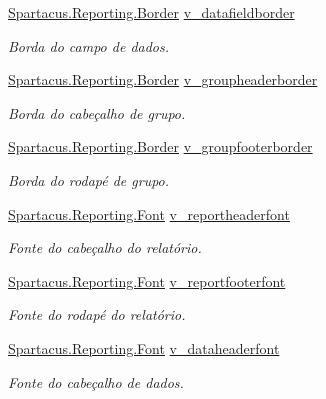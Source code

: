 \begin{DoxyCompactItemize}
\hyperlink{classSpartacus_1_1Reporting_1_1Border}{Spartacus.\+Reporting.\+Border} \hyperlink{classSpartacus_1_1Reporting_1_1Settings_a86f45f3b84d7442c633b4c2ff122ae23}{v\+\_\+datafieldborder}
\begin{DoxyCompactList}\small\item\em Borda do campo de dados. \end{DoxyCompactList}\item 
\hyperlink{classSpartacus_1_1Reporting_1_1Border}{Spartacus.\+Reporting.\+Border} \hyperlink{classSpartacus_1_1Reporting_1_1Settings_a89a455cc29d0713654c88c01e28c8697}{v\+\_\+groupheaderborder}
\begin{DoxyCompactList}\small\item\em Borda do cabeçalho de grupo. \end{DoxyCompactList}\item 
\hyperlink{classSpartacus_1_1Reporting_1_1Border}{Spartacus.\+Reporting.\+Border} \hyperlink{classSpartacus_1_1Reporting_1_1Settings_aa2187138e5652cf09e1c48185c308658}{v\+\_\+groupfooterborder}
\begin{DoxyCompactList}\small\item\em Borda do rodapé de grupo. \end{DoxyCompactList}\item 
\hyperlink{classSpartacus_1_1Reporting_1_1Font}{Spartacus.\+Reporting.\+Font} \hyperlink{classSpartacus_1_1Reporting_1_1Settings_a73b6afdacc9e772b787292f79a7acfa8}{v\+\_\+reportheaderfont}
\begin{DoxyCompactList}\small\item\em Fonte do cabeçalho do relatório. \end{DoxyCompactList}\item 
\hyperlink{classSpartacus_1_1Reporting_1_1Font}{Spartacus.\+Reporting.\+Font} \hyperlink{classSpartacus_1_1Reporting_1_1Settings_a94a772ad49278c050f06a4cc367863f8}{v\+\_\+reportfooterfont}
\begin{DoxyCompactList}\small\item\em Fonte do rodapé do relatório. \end{DoxyCompactList}\item 
\hyperlink{classSpartacus_1_1Reporting_1_1Font}{Spartacus.\+Reporting.\+Font} \hyperlink{classSpartacus_1_1Reporting_1_1Settings_ac1b830e87f4ad20f94be1e2b88384104}{v\+\_\+dataheaderfont}
\begin{DoxyCompactList}\small\item\em Fonte do cabeçalho de dados. \end{DoxyCompactList}\item 

\end{DoxyCompactItemize}
